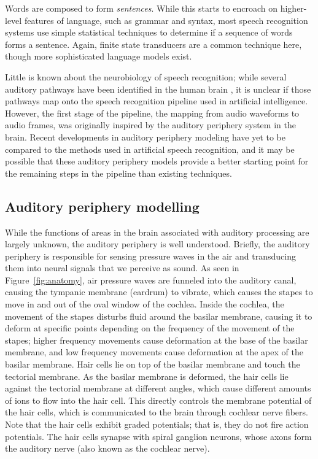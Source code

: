 \documentclass{article}
\begin{document}
Words are composed to form \textit{sentences}.
While this starts to encroach
on higher-level features of language,
such as grammar and syntax,
most speech recognition systems
use simple statistical techniques
to determine if a sequence of words
forms a sentence.
Again, finite state transducers
are a common technique here,
though more sophisticated language models exist.

Little is known about the neurobiology
of speech recognition;
while several auditory pathways have been identified
in the human brain \citep{scott2003},
it is unclear if those pathways map onto
the speech recognition pipeline
used in artificial intelligence.
However, the first stage of the pipeline,
the mapping from audio waveforms
to audio frames, was originally inspired
by the auditory periphery system
in the brain.
Recent developments in auditory periphery modeling
have yet to be compared to the methods used
in artificial speech recognition,
and it may be possible that
these auditory periphery models
provide a better starting point
for the remaining steps in the pipeline
than existing techniques.

\subsection{Auditory periphery modelling}

While the functions of areas in the brain
associated with auditory processing
are largely unknown,
the auditory periphery is well understood.
Briefly, the auditory periphery
is responsible for sensing pressure waves
in the air and transducing them into
neural signals that we perceive as sound.
As seen in Figure~\ref{fig:anatomy},
air pressure waves are funneled into the auditory canal,
causing the tympanic membrane (eardrum)
to vibrate, which causes the stapes
to move in and out of the oval window of the cochlea.
Inside the cochlea, the movement of the stapes
disturbs fluid around the basilar membrane,
causing it to deform at specific points
depending on the frequency of the movement
of the stapes; higher frequency movements
cause deformation at the base of the basilar membrane,
and low frequency movements cause deformation
at the apex of the basilar membrane.
Hair cells lie on top of the basilar membrane
and touch the tectorial membrane.
As the basilar membrane is deformed,
the hair cells lie against
the tectorial membrane at different angles,
which cause different amounts of ions
to flow into the hair cell.
This directly controls the membrane potential
of the hair cells,
which is communicated
to the brain through cochlear nerve fibers.
Note that the hair cells exhibit graded potentials;
that is, they do not fire action potentials.
The hair cells synapse with spiral ganglion neurons,
whose axons form the auditory nerve
(also known as the cochlear nerve).
\end{document}
